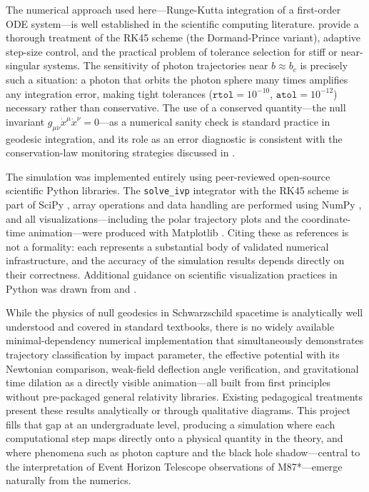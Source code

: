 \documentclass[12pt,a4paper]{article}
\begin{document}
The numerical approach used here—Runge-Kutta integration of a first-order ODE system—is well established in the scientific computing literature. \citet{Chapra2015} provide a thorough treatment of the RK45 scheme (the Dormand-Prince variant), adaptive step-size control, and the practical problem of tolerance selection for stiff or near-singular systems. The sensitivity of photon trajectories near $b \approx b_c$ is precisely such a situation: a photon that orbits the photon sphere many times amplifies any integration error, making tight tolerances ($\texttt{rtol} = 10^{-10}$, $\texttt{atol} = 10^{-12}$) necessary rather than conservative. The use of a conserved quantity—the null invariant $g_{\mu\nu}\dot{x}^\mu\dot{x}^\nu = 0$—as a numerical sanity check is standard practice in geodesic integration, and its role as an error diagnostic is consistent with the conservation-law monitoring strategies discussed in \citet{Chapra2015}.

The simulation was implemented entirely using peer-reviewed open-source scientific Python libraries. The \texttt{solve\_ivp} integrator with the RK45 scheme is part of SciPy \citep{Virtanen2020}, array operations and data handling are performed using NumPy \citep{Harris2020}, and all visualizations—including the polar trajectory plots and the coordinate-time animation—were produced with Matplotlib \citep{Hunter2007}. Citing these as references is not a formality: each represents a substantial body of validated numerical infrastructure, and the accuracy of the simulation results depends directly on their correctness. Additional guidance on scientific visualization practices in Python was drawn from \citet{Rougier2021} and \citet{VanderPlas2016}.

While the physics of null geodesics in Schwarzschild spacetime is analytically well understood and covered in standard textbooks, there is no widely available minimal-dependency numerical implementation that simultaneously demonstrates trajectory classification by impact parameter, the effective potential with its Newtonian comparison, weak-field deflection angle verification, and gravitational time dilation as a directly visible animation—all built from first principles without pre-packaged general relativity libraries. Existing pedagogical treatments present these results analytically or through qualitative diagrams. This project fills that gap at an undergraduate level, producing a simulation where each computational step maps directly onto a physical quantity in the theory, and where phenomena such as photon capture and the black hole shadow—central to the interpretation of Event Horizon Telescope observations of M87*—emerge naturally from the numerics.
\end{document}
